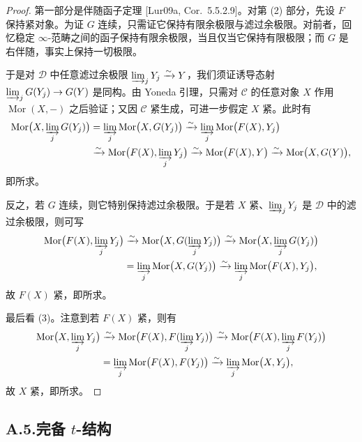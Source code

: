 \begin{proof}
第一部分是伴随函子定理 [Lur09a, Cor.~5.5.2.9]。对第 \textup{(2)} 部分，先设 $F$ 保持紧对象。为证 $G$ 连续，只需证它保持有限余极限与滤过余极限。对前者，回忆稳定 $\infty$-范畴之间的函子保持有限余极限，当且仅当它保持有限极限；而 $G$ 是右伴随，事实上保持一切极限。


于是对 $\mathcal D$ 中任意滤过余极限 $\varinjlim_j Y_j\xrightarrow{\sim}Y$，我们须证诱导态射 $\varinjlim_j G(Y_j)\to G(Y)$ 是同构。由 Yoneda 引理，只需对 $\mathcal C$ 的任意对象 $X$ 作用 $\operatorname{Mor}(X,-)$ 之后验证；又因 $\mathcal C$ 紧生成，可进一步假定 $X$ 紧。此时有
\begin{align*}
\operatorname{Mor}\bigl(X,\varinjlim_j G(Y_j)\bigr)
&=\varinjlim_j\operatorname{Mor}\bigl(X,G(Y_j)\bigr)
\xrightarrow{\sim}\varinjlim_j\operatorname{Mor}\bigl(F(X),Y_j\bigr)\\
&\xrightarrow{\sim}\operatorname{Mor}\bigl(F(X),\varinjlim_j Y_j\bigr)
\xrightarrow{\sim}\operatorname{Mor}\bigl(F(X),Y\bigr)
\xrightarrow{\sim}\operatorname{Mor}\bigl(X,G(Y)\bigr),
\end{align*}
即所求。

反之，若 $G$ 连续，则它特别保持滤过余极限。于是若 $X$ 紧、$\varinjlim_j Y_j$ 是 $\mathcal D$ 中的滤过余极限，则可写
\begin{align*}
\operatorname{Mor}\bigl(F(X),\varinjlim_j Y_j\bigr)
&\xrightarrow{\sim}\operatorname{Mor}\bigl(X,G(\varinjlim_j Y_j)\bigr)
\xrightarrow{\sim}\operatorname{Mor}\bigl(X,\varinjlim_j G(Y_j)\bigr)\\
&=\varinjlim_j\operatorname{Mor}\bigl(X,G(Y_j)\bigr)
\xrightarrow{\sim}\varinjlim_j\operatorname{Mor}\bigl(F(X),Y_j\bigr),
\end{align*}
故 $F(X)$ 紧，即所求。

最后看 \textup{(3)}。注意到若 $F(X)$ 紧，则有
\begin{align*}
\operatorname{Mor}\bigl(X,\varinjlim_j Y_j\bigr)
&\xrightarrow{\sim}\operatorname{Mor}\bigl(F(X),F(\varinjlim_j Y_j)\bigr)
\xrightarrow{\sim}\operatorname{Mor}\bigl(F(X),\varinjlim_j F(Y_j)\bigr)\\
&=\varinjlim_j\operatorname{Mor}\bigl(F(X),F(Y_j)\bigr)
\xrightarrow{\sim}\varinjlim_j\operatorname{Mor}\bigl(X,Y_j\bigr),
\end{align*}
故 $X$ 紧，即所求。
\end{proof}

\subsection*{A.5.\quad 完备 $t$-结构}

